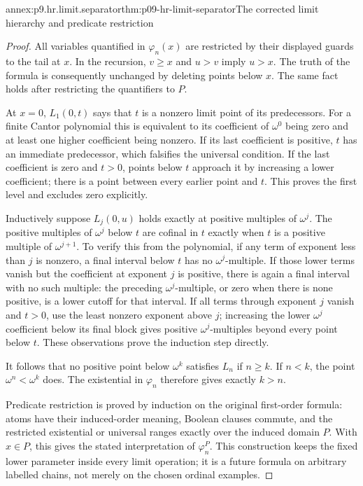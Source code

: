 \begin{annexitem}{annex:p9.hr.limit.separator}{thm:p09-hr-limit-separator}{The corrected limit hierarchy and predicate restriction}
\begin{proof}
All variables quantified in \(\varphi_n(x)\)
are restricted by their displayed guards to
the tail at \(x\). In the recursion, \(v\geq x\)
and \(u>v\) imply \(u>x\). The truth
of the formula is consequently unchanged
by deleting points below \(x\). The same
fact holds after restricting the quantifiers
to \(P\).

At \(x=0\), \(L_1(0,t)\) says that \(t\)
is a nonzero limit point of its predecessors.
For a finite Cantor polynomial this is
equivalent to its coefficient of \(\omega^0\)
being zero and at least one higher coefficient
being nonzero. If its last coefficient is
positive, \(t\) has an immediate predecessor,
which falsifies the universal condition.
If the last coefficient is zero and
\(t>0\), points below \(t\) approach
it by increasing a lower coefficient;
there is a point between every earlier
point and \(t\). This proves the first
level and excludes zero explicitly.

Inductively suppose \(L_j(0,u)\)
holds exactly at positive multiples
of \(\omega^j\). The positive
multiples of \(\omega^j\) below
\(t\) are cofinal in \(t\)
exactly when \(t\) is a positive
multiple of \(\omega^{j+1}\).
To verify this from the polynomial,
if any term of exponent less
than \(j\) is nonzero, a final
interval below \(t\) has no
\(\omega^j\)-multiple. If those
lower terms vanish but the
coefficient at exponent \(j\)
is positive, there is again
a final interval with no such
multiple: the preceding
\(\omega^j\)-multiple, or zero
when there is none positive,
is a lower cutoff for that
interval. If all terms through
exponent \(j\) vanish and
\(t>0\), use the least nonzero
exponent above \(j\); increasing
the lower \(\omega^j\) coefficient
below its final block gives
positive \(\omega^j\)-multiples
beyond every point below \(t\).
These observations prove the
induction step directly.

It follows that no positive
point below \(\omega^k\)
satisfies \(L_n\) if \(n\geq k\).
If \(n<k\), the point
\(\omega^n<\omega^k\) does.
The existential in \(\varphi_n\)
therefore gives exactly \(k>n\).

Predicate restriction is proved
by induction on the original
first-order formula: atoms have
their induced-order meaning,
Boolean clauses commute, and
the restricted existential or
universal ranges exactly over
the induced domain \(P\).
With \(x\in P\), this gives
the stated interpretation of
\(\varphi_n^P\). This construction
keeps the fixed lower parameter
inside every limit operation;
it is a future formula on
arbitrary labelled chains,
not merely on the chosen
ordinal examples.
\end{proof}
\end{annexitem}

